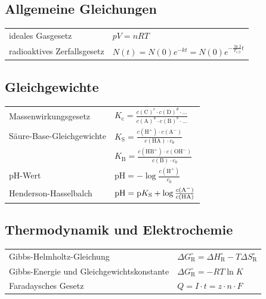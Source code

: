 \subsection*{Allgemeine Gleichungen}

\begin{table}[H]
\renewcommand{\arraystretch}{1.3}
    \begin{tabular}{p{7cm} l}
       ideales Gasgesetz & $p V = n R T$\\
       radioaktives Zerfallsgesetz & $N(t) = N(0) e^{-k t} = N(0) e^{-\frac{\ln 2}{T_{1/2}} t}$\\
    \end{tabular}
\end{table}

\subsection*{Gleichgewichte}

\begin{table}[H]
\renewcommand{\arraystretch}{1.3}
    \begin{tabular}{p{7cm} l}
       Massenwirkungsgesetz & $K_\mathrm{c} = \frac{c(\mathrm{C})^c \cdot c(\mathrm{D})^d \cdot \dots}{c(\mathrm{A})^a \cdot c(\mathrm{B})^b \cdot \dots}$\\
       Säure-Base-Gleichgewichte & $K_\mathrm{S} = \frac{c(\mathrm{H^+}) \cdot c(\mathrm{A^-})}{c(\mathrm{HA}) \cdot c_0}$\\
       & $K_\mathrm{B} = \frac{c(\mathrm{HB^+}) \cdot c(\mathrm{OH^-})}{c(\mathrm{B})\cdot  c_0}$\\
       pH-Wert & $\mathrm{pH} = - \log \frac{c(\mathrm{H^+})}{c_0}$\\
       Henderson-Hasselbalch & $\mathrm{pH} = \mathrm{p}K_\mathrm{S} + \log \frac{c(\ce{A-})}{c(\ce{HA})}$\\
    \end{tabular}
\end{table}

\subsection*{Thermodynamik und Elektrochemie}

\begin{table}[H]
\renewcommand{\arraystretch}{1.3}
    \begin{tabular}{p{7cm} l}
       Gibbs-Helmholtz-Gleichung & $\Delta G_\mathrm{R}^\circ = \Delta H_\mathrm{R}^\circ - T \Delta S_\mathrm{R}^\circ$\\
      Gibbs-Energie und Gleichgewichtskonstante & $\Delta G_\mathrm{R}^\circ = - R T \ln K$\\
       Faradaysches Gesetz & $Q = I \cdot t = z \cdot n \cdot F$
    \end{tabular}
\end{table}